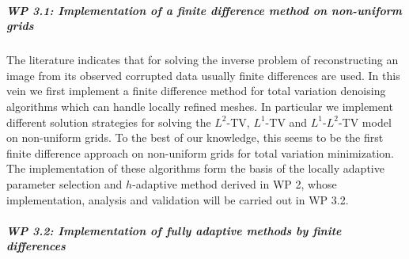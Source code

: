 \documentclass[enabledeprecatedfontcommands,cleardoublepage=empty,headsepline,twoside,11pt,DIV=15,BCOR=12mm,final]{scrartcl}
\begin{document}
 
\subparagraph{WP 3.1: Implementation of a finite difference method on non-uniform grids}
 
 The literature indicates that for solving the inverse problem of reconstructing an image from its observed corrupted data usually finite differences are used. In this vein we first implement a finite difference method for total variation denoising algorithms which can handle locally refined meshes. In particular we implement different solution strategies for solving the $L^2$-TV, $L^1$-TV and $L^1$-$L^2$-TV model on non-uniform grids. %
 To the best of our knowledge, this seems to be the first finite difference approach on non-uniform grids for total variation minimization. The implementation of these algorithms form the basis of the locally adaptive parameter selection and $h$-adaptive method derived in WP 2, whose implementation, analysis and validation will be carried out in WP 3.2. %

 \subparagraph{WP 3.2: Implementation of fully adaptive methods by finite differences}
 
\end{document}
